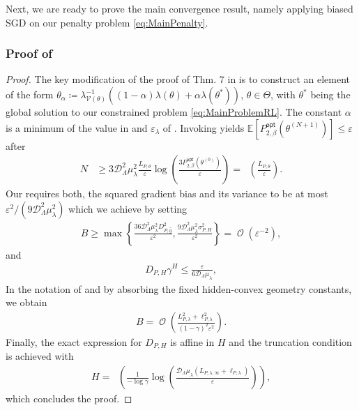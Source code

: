 \documentclass{article}
\theoremstyle{plain}
\theoremstyle{definition}
\theoremstyle{remark}
\def\VV{{\mathcal{V}}}
\DeclareMathOperator{\OOTildeSym}{\widetilde{\mathcal{O}}}
\DeclareMathOperator{\OOSym}{\mathcal{O}}
\newcommand{\OOTilde}[1]{{\OOTildeSym\!\left(#1\right)}}
\newcommand{\OO}[1]{{\OOSym\!\left(#1\right)}}
\def\epsilon{{\varepsilon}}
\newcommand{\Exp}[1]{{ \mathbb{E}}\!\left[#1\right]}
\newcommand{\define}{\coloneqq}
\def\xx{{\theta}}
\def\xxOpt{\xx^{*}}
\def\xxZero{\xx^{(0)}}
\def\xxNnext{\xx^{(N+1)}}
\def\epsLam{\epsilon_\lambda}
\def\optLabel{\mathsf{opt}}
\newcommand{\penOpt}[1]{P^\optLabel_{#1}}
\def\XX{{\Theta}}
\def\UU{{\Lambda}}
\def\DDU{{\mathcal{D}_\UU}}
\def\DDUsq{{\mathcal{D}^2_\UU}}
\def\gApprox{{\hat{g}}}
\def\lamLip{{\mu_\lambda}}
\def\lamLipSq{{\mu^2_\lambda}}
\begin{document}
Next, we are ready to prove the main convergence result, namely applying
biased SGD on our penalty problem \eqref{eq:MainPenalty}.
\subsubsection{Proof of }
\label{thm:MainResultPenalty-PROOF}
\begin{proof}
 The key modification of the proof of Thm. 7 in
 \cite{fatkhullinStochasticOptimizationHidden2025} is to construct an element
 of the form $\xx_{\alpha} \define \lambda^{-1}_{\VV(\xx)}\left((1-\alpha)
  \lambda(\xx) + \alpha \lambda(\xxOpt)\right)$, $\xx \in \XX$,
 with $\xxOpt$ being the
 global solution to our constrained problem \eqref{eq:MainProblemRL}.
 The constant $\alpha$ is a minimum of the value in
  and $\epsLam$ of
 . Invoking  yields
 $\Exp{\penOpt{2,\beta}(\xxNnext)}
  \leq\epsilon$
 after
 \begin{align*}
  N
   & \geq 3\DDUsq\lamLipSq
  \frac{L_{P,\theta}}{\epsilon}
  \log\left(\frac{3\penOpt{2,\beta}(\xxZero)}{\epsilon}\right)
  =\OOTilde{\frac{L_{P,\theta}}{\epsilon}}.
 \end{align*}
 Our  requires both, the squared
 gradient bias and its variance to be at most
 $\epsilon^2/(9\DDUsq\lamLipSq)$ which we achieve by setting
 \begin{align*}
  B\geq\max\left\{
  \frac{36\DDUsq\lamLipSq D_{P,\gApprox}^2}{\epsilon^2},
  \frac{9\DDUsq\lamLipSq\sigma_{P,H}^2}{\epsilon^2}
  \right\}=\OO{\epsilon^{-2}},
 \end{align*}
 and
 \begin{align*}
  D_{P,H}\gamma^H
  \leq\frac{\epsilon}{6\DDU\lamLip},
 \end{align*}
 In the notation of
  and by absorbing the fixed
 hidden-convex geometry constants, we obtain
 \begin{align*}
  B=\OO{\frac{L_{P,\lambda}^2+\ell_{P,\lambda}^2}
   {(1-\gamma)^2\epsilon^2}}.
 \end{align*}
 Finally, the exact expression for $D_{P,H}$ is affine in $H$ and
 the truncation condition is achieved with
 \begin{align*}
  H=\OOTilde{\frac{1}{-\log\gamma}
   \log\left(\frac{\DDU\lamLip
    (L_{P,\lambda,\infty}+\ell_{P,\lambda})}
   {\epsilon}\right)},
 \end{align*}
 which concludes the proof.
\end{proof}
\end{document}
